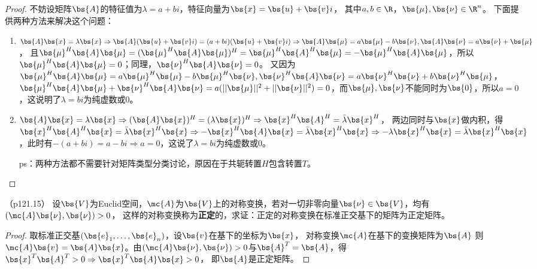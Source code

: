 \documentclass[12pt, a4paper, oneside, UTF8]{ctexbook}
\begin{document}
\begin{proof}
    不妨设矩阵$\bs{A}$的特征值为$\lambda=a+bi$，特征向量为$\bs{x}=\bs{u}+\bs{v}i$，
        其中$a,b \in \R$，$\bs{\mu},\bs{\nu} \in \R^n$。
        下面提供两种方法来解决这个问题：
    \begin{enumerate}[label=(\arabic*)]
        \item     
        $\bs{A}\bs{x}=\lambda\bs{x} \Rightarrow \bs{A}(\bs{u}+\bs{v}i)=(a+bi)(\bs{u}+\bs{v}i) \Rightarrow \bs{A}\bs{\mu}=a\bs{\mu}-b\bs{\nu},\bs{A}\bs{\nu}=a\bs{\nu}+\bs{\mu}$，
        且$\bs{\mu}^H\bs{A}\bs{\mu}=(\bs{\mu}^H\bs{A}\bs{\mu})^H=\bs{\mu}^H\bs{A}^H\bs{\mu}=-\bs{\mu}^H\bs{A}\bs{\mu}$，所以$\bs{\mu}^H\bs{A}\bs{\mu}=0$；同理，$\bs{\nu}^H\bs{A}\bs{\nu}=0$。
        又因为$\bs{\mu}^H\bs{A}\bs{\mu}=a\bs{\mu}^H\bs{\mu}-b\bs{\mu}^H\bs{\nu},\bs{\nu}^H\bs{A}\bs{\nu}=a\bs{\nu}^H\bs{\nu}+b\bs{\nu}^H\bs{\mu}$，
        $\bs{\mu}^H\bs{A}\bs{\mu}+\bs{\nu}^H\bs{A}\bs{\nu}=a(||\bs{\mu}||^2+||\bs{\nu}||^2)=0$，而$\bs{\mu},\bs{\nu}$不能同时为$\bs{0}$，所以$a=0$，这说明了$\lambda=bi$为纯虚数或0。
        \item  $\bs{A}\bs{x}=\lambda\bs{x} \Rightarrow  (\bs{A}\bs{x})^H=(\lambda\bs{x})^H \Rightarrow \bs{x}^H\bs{A}^H=\bar{\lambda}\bs{x}^H $，
        两边同时与$\bs{x}$做内积，得$\bs{x}^H\bs{A}^H\bs{x}=\bar{\lambda}\bs{x}^H\bs{x} \Rightarrow -\bs{x}^H\bs{A}\bs{x}=\bar{\lambda}\bs{x}^H\bs{x}
        \Rightarrow -\lambda \bs{x}^H\bs{x}=\bar{\lambda}\bs{x}^H\bs{x}$，此时有$-(a+bi)=a-bi \Rightarrow a=0$，这说了$\lambda=bi$为纯虚数或0。
        
        ps：两种方法都不需要针对矩阵类型分类讨论，原因在于共轭转置$H$包含转置$T$。
    \end{enumerate}
\end{proof}

\begin{question}（p121.15）
    设$\bs{V}$为Euclid空间，$\mc{A}$为$\bs{V}$上的对称变换，若对一切非零向量$\bs{\nu} \in \bs{V}$，均有$(\mc{A}\bs{\nu},\bs{\nu}) > 0$，
    这样的对称变换称为\textbf{正定}的，求证：正定的对称变换在标准正交基下的矩阵为正定矩阵。
\end{question}

\begin{proof}
    取标准正交基$(\bs{e}_1,\ldots,\bs{e}_n)$，设$\bs{v}$在基下的坐标为$\bs{x}$，
    对称变换$\mc{A}$在基下的变换矩阵为$\bs{A}$
    则$\mc{A}\bs{v}=\bs{A}\bs{x}$。由$(\mc{A}\bs{\nu},\bs{\nu}) > 0$与$\bs{A}^T=\bs{A}$，得$\bs{x}^T\bs{A}^T> 0 \Rightarrow \bs{x}^T\bs{A}\bs{x}>0$，
    即$\bs{A}$是正定矩阵。
\end{proof}
\end{document}

